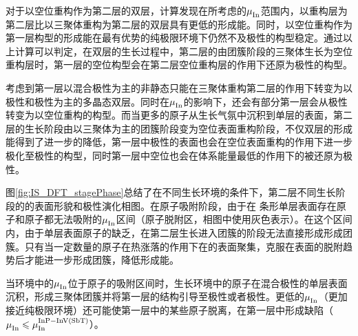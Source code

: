对于以空位重构作为第二层的双层，计算发现在所考虑的$\it \mu_{\rm In}^{\rm } \it$范围内，以重构层为第二层比以三聚体重构为第二层的双层具有更低的形成能。同时，以空位重构作为第一层构型的形成能在最有优势的纯极限环境下仍然不及极性的构型稳定。通过以上计算可以判定，在双层的生长过程中，第二层的由团簇阶段的三聚体生长为空位重构层时，第一层的空位构型会在第二层空位重构层的作用下还原为极性的构型。

考虑到第一层以混合极性为主的非静态只能在三聚体重构第二层的作用下转变为以极性和极性为主的多晶态双层。同时在$\it \mu_{\rm In}^{\rm } \it$的影响下，还会有部分第一层会从极性转变为以空位重构的构型。而当更多的原子从生长气氛中沉积到单层的表面，第二层的生长阶段由以三聚体为主的团簇阶段变为空位表面重构阶段，不仅双层的形成能得到了进一步的降低，第一层中极性的表面也会在空位表面重构的作用下进一步极化至极性的构型，同时第一层中空位也会在体系能量最低的作用下的被还原为极性。

图\ref{fig:IS_DFT_stagePhase}总结了在不同生长环境的条件下，第二层不同生长阶段的的表面形貌和极性演化相图。在原子吸附阶段，由于在 条形单层表面存在原子和原子都无法吸附的$\it \mu_{\rm In}^{\rm } \it$区间（原子脱附区，相图中使用灰色表示）。在这个区间内，由于单层表面原子的缺乏，在第二层生长进入团簇的阶段无法直接形成形成团簇。只有当一定数量的原子在热涨落的作用下在的表面聚集，克服在表面的脱附趋势后才能进一步形成团簇，降低形成能。

当环境中的$\it \mu_{\rm In}^{\rm } \it$位于原子的吸附区间时，生长环境中的原子在混合极性的单层表面沉积，形成三聚体团簇并将第一层的结构引导至极性或者极性。更低的$\it \mu_{\rm In}^{\rm } \it$（更加接近纯极限环境）还可能使第一层中的某些原子脱离，在第一层中形成缺陷（$\it \mu_{\rm In}^{\rm } \it\leqslant \it \mu_{\rm In}^{\rm InP-InV\left(SbT\right)} \it$）。

